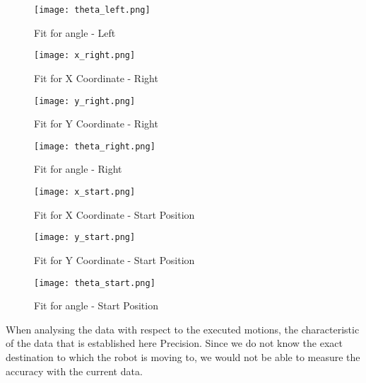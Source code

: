 \documentclass[10pt,a4paper]{article}
\begin{document}
\begin{figure}[H]
	\centering
	\texttt{[image: theta\_left.png]}
	\caption{Fit for angle - Left}
\end{figure}

\begin{figure}[H]
	\centering
	\texttt{[image: x\_right.png]}
	\caption{Fit for X Coordinate - Right}
\end{figure}

\begin{figure}[H]
	\centering
	\texttt{[image: y\_right.png]}
	\caption{Fit for Y Coordinate - Right}
\end{figure}	

\begin{figure}[H]
	\centering
	\texttt{[image: theta\_right.png]}
	\caption{Fit for angle - Right}
\end{figure}

\begin{figure}[H]
	\centering
	\texttt{[image: x\_start.png]}
	\caption{Fit for X Coordinate - Start Position}
\end{figure}

\begin{figure}[H]
	\centering
	\texttt{[image: y\_start.png]}
	\caption{Fit for Y Coordinate - Start Position}
\end{figure}	

\begin{figure}[H]
	\centering
	\texttt{[image: theta\_start.png]}
	\caption{Fit for angle - Start Position}
\end{figure}

When analysing the data with respect to the executed motions, the characteristic of the data that is established here Precision. Since we do not know the exact destination to which the robot is moving to, we would not be able to measure the accuracy with the current data.
\end{document}
